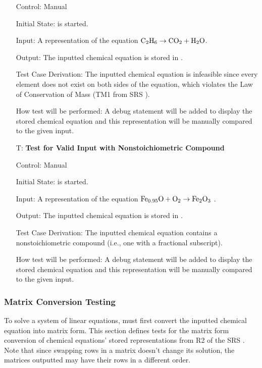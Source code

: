 \documentclass[12pt, titlepage]{article}
\newcounter{testnum} %
\begin{document}
\begin{enumerate}
    Control: Manual

    Initial State: \progname{} is started.

    Input: A representation of the equation
    $\ce{C2H6} \rightarrow \ce{CO2} + \ce{H2O}$.

    Output: The inputted chemical equation is stored in \progname{}.

    Test Case Derivation: The inputted chemical equation is infeasible since
    every element does not exist on both sides of the equation, which violates
    the Law of Conservation of Mass (TM1 from SRS ).

    How test will be performed: A debug statement will be added to display the
    stored chemical equation and this representation will be manually compared to
    the given input.

  \item[T\refstepcounter{testnum}\thetestnum \label{test_nonstoich_valid_input}:]
    \textbf{Test for Valid Input with Nonstoichiometric Compound}

    Control: Manual

    Initial State: \progname{} is started.

    Input: A representation of the equation
    $\ce{Fe_{0.95}O} + \ce{O2} \rightarrow \ce{Fe2O3}$
    \cite{doubtnut_when_nodate}.

    Output: The inputted chemical equation is stored in \progname{}.

    Test Case Derivation: The inputted chemical equation contains a
    nonstoichiometric compound (i.e., one with a fractional subscript).

    How test will be performed: A debug statement will be added to display the
    stored chemical equation and this representation will be manually compared to
    the given input.

\end{enumerate}

\subsubsection{Matrix Conversion Testing}

To solve a system of linear equations, \progname{} must first convert the
inputted chemical equation into matrix form. This section defines tests for
the matrix form conversion of chemical equations' stored representations from
R2 of the SRS . 
Note that since swapping rows in a matrix doesn't change its solution, the
matrices outputted may have their rows in a different order.
\end{document}
